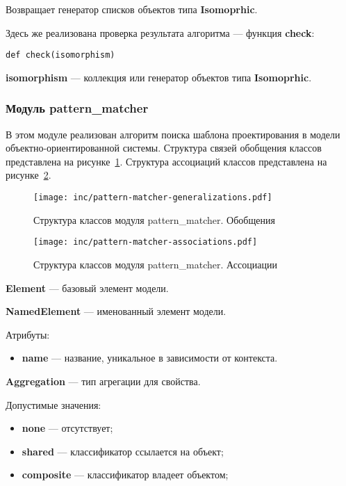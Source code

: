 Возвращает генератор списков объектов типа \textbf{Isomoprhic}.

Здесь же реализована проверка результата алгоритма --- функция \textbf{check}:

\begin{verbatim}
def check(isomorphism)
\end{verbatim}

\textbf{isomorphism} --- коллекция или генератор объектов типа \textbf{Isomoprhic}.

\subsubsection{Модуль pattern\_matcher}

В этом модуле реализован алгоритм поиска шаблона проектирования в модели
объектно-ориентированной системы.
Структура связей обобщения классов представлена на рисунке~\ref{fig:pattern-matcher-generalizations}.
Структура ассоциаций классов представлена на рисунке~\ref{fig:pattern-matcher-associations}.

\begin{figure}[!ht]
\centering
\texttt{[image: inc/pattern-matcher-generalizations.pdf]}
\caption{Структура классов модуля pattern\_matcher. Обобщения}
\label{fig:pattern-matcher-generalizations}
\end{figure}

\begin{figure}[!ht]
\centering
\texttt{[image: inc/pattern-matcher-associations.pdf]}
\caption{Структура классов модуля pattern\_matcher. Ассоциации}
\label{fig:pattern-matcher-associations}
\end{figure}

\textbf{Element} --- базовый элемент модели.

\textbf{NamedElement} --- именованный элемент модели.

Атрибуты:
\begin{itemize}
\item \textbf{name} --- название, уникальное в зависимости от контекста.
\end{itemize}

\textbf{Aggregation} --- тип агрегации для свойства.

Допустимые значения:
\begin{itemize}
\item \textbf{none} --- отсутствует;
\item \textbf{shared} --- классификатор ссылается на объект;
\item \textbf{composite} --- классификатор владеет объектом;
\end{itemize}

